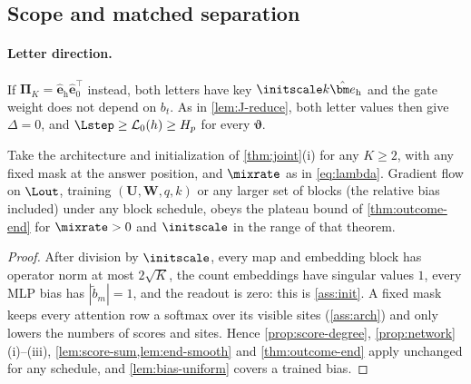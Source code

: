 



\subsection{Scope and matched separation}
\label{app:step-learning-scope}
\label{app:weak-routing-limitations}

\paragraph{Letter direction.} If $\bm\Pi_K=\hat{\bm e}_{\mathrm h}\hat{\bm e}_0^\top$ instead, both letters have key $\initscale k\hat{\bm e}_{\mathrm h}$ and the gate weight does not depend on $b_t$.
As in \cref{lem:J-reduce}, both letter values then give $\Delta=0$, and $\Lstep\ge \mathcal L_0(h)\ge H_p$ for every $\bm\vartheta$.

\begin{corollary}
\label{cor:joint-outcome}
Take the architecture and initialization of \cref{thm:joint}(i) for any $K\ge2$, with any fixed mask at the answer position, and $\mixrate$ as in
\cref{eq:lambda}. Gradient flow on $\Lout$, training $(\mathbf U,\mathbf W,q,k)$ or any larger set of blocks (the relative bias included) under any block
schedule, obeys the plateau bound of \cref{thm:outcome-end} for $\mixrate>0$ and $\initscale$ in the range of that theorem.
\end{corollary}

\begin{proof}
After division by $\initscale$, every map and embedding block has operator norm at most $2\sqrt K$, the count embeddings have singular values
$1$, every MLP bias has $|\tilde b_m|=1$, and the readout is zero: this is \cref{ass:init}. A fixed mask keeps every attention row a softmax over
its visible sites (\cref{ass:arch}) and only lowers the numbers of scores and sites. Hence \cref{prop:score-degree}, \cref{prop:network}(i)--(iii),
\cref{lem:score-sum,lem:end-smooth} and \cref{thm:outcome-end} apply unchanged for any schedule, and \cref{lem:bias-uniform} covers a trained bias.
\end{proof}

